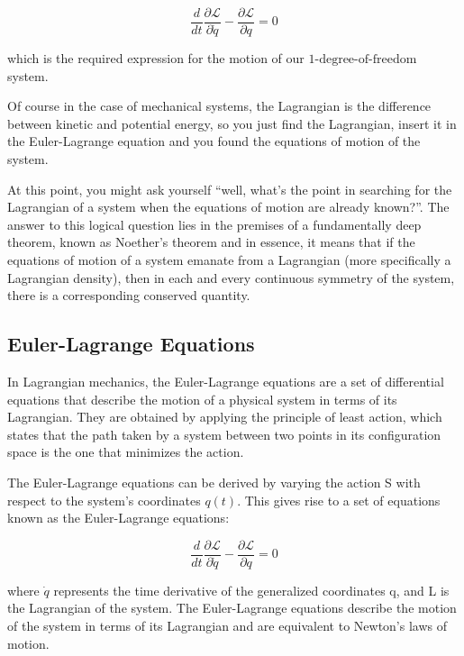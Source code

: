 \documentclass[12pt, a4paper]{article} %
\begin{document}
\begin{equation*}
    \frac{d}{dt}\frac{\partial \mathscr{L}}{\partial \dot{q}} - \frac{\partial \mathscr{L}}{\partial q}  = 0 \tag*{(3)}
\end{equation*}

\BgThispage

which is the required expression for the motion of our $1\mbox{-degree-of-freedom}$ system.

Of course in the case of mechanical systems, the Lagrangian is the difference between kinetic and potential energy, so you just find the Lagrangian, insert it in the Euler-Lagrange equation and you found the equations of motion of the system.

At this point, you might ask yourself “well, what's the point in searching for the Lagrangian of a system when the equations of motion are already known?”. The answer to this logical question lies in the premises of a fundamentally deep theorem, known as Noether's theorem and in essence, it means that if the equations of motion of a system emanate from a Lagrangian (more specifically a Lagrangian density), then in each and every continuous symmetry of the system, there is a corresponding conserved quantity.

\subsection{Euler-Lagrange Equations}

In Lagrangian mechanics, the Euler-Lagrange equations are a set of differential equations that describe the motion of a physical system in terms of its Lagrangian. They are obtained by applying the principle of least action, which states that the path taken by a system between two points in its configuration space is the one that minimizes the action.

The Euler-Lagrange equations can be derived by varying the action S with respect to the system's coordinates $q(t)$. This gives rise to a set of equations known as the Euler-Lagrange equations:

\begin{equation*}
    \frac{d}{dt}\frac{\partial \mathscr{L}}{\partial \dot{q}} - \frac{\partial \mathscr{L}}{\partial q}  = 0 
\end{equation*}


\BgThispage

where $\dot{q}$ represents the time derivative of the generalized coordinates q, and L is the Lagrangian of the system. The Euler-Lagrange equations describe the motion of the system in terms of its Lagrangian and are equivalent to Newton's laws of motion.
\end{document}

